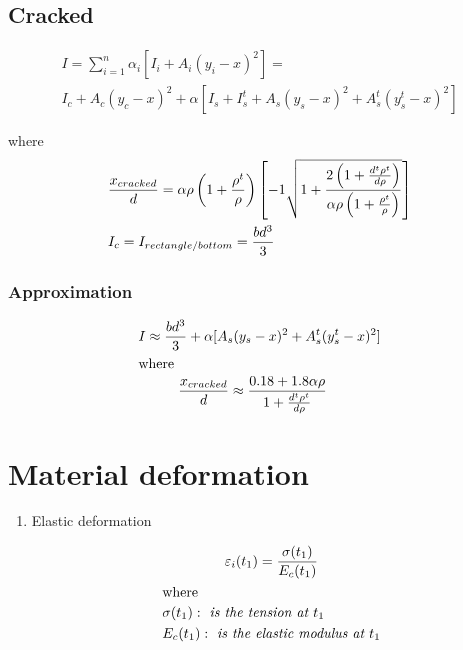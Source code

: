 \documentclass[landscape]{article}
\begin{document}
\begin{multicols*}{2}

    \subsection{Cracked} %
    \label{sub:cracked}

    \begin{multline}
      I = \sum_{i=1}^n \alpha_i[I_i + A_i (y_i-x)^2]=\\ I_c + A_c (y_c-x)^2 + \alpha[I_s + I_s^t + A_s (y_s-x)^2 + A_s^t (y_s^t-x)^2]  
    \end{multline}

  where
    $$
      \begin{aligned}
        &\frac{x_{cracked}}{d}= \alpha \rho \left(1 + \frac{\rho^t}{\rho} \right) \left[ - 1 \sqrt{1+ \frac{2\left(1 + \frac{d^t\rho^t}{d\rho}\right)}{\alpha \rho \left(1 + \frac{\rho^t}{\rho}\right) } }\right] \\
        & I_c= I_{rectangle/bottom} = \frac{bd^3}{3}
      \end{aligned}\notag
    $$

    \subsubsection{Approximation} %
    \label{ssub:approximation}

    \begin{gather}\label{eq:2.1}
      I \approx \frac{bd^3}{3}+ \alpha[ A_s (y_s-x)^2 + A_s^t (y_s^t-x)^2] \\
      \shortintertext{where}
      \begin{aligned}
        &\frac{x_{cracked}}{d} \approx \frac{0.18 + 1.8\alpha \rho }{1 + \frac{d^t \rho^t }{d \rho}}
      \end{aligned}\notag
    \end{gather}

\section{Material deformation} %
    \label{sec:material_properties}
    \begin{enumerate}
      \item Elastic deformation

      \begin{gather}\label{eq:2.1}
      \varepsilon_i(t_1) = \frac{\sigma(t_1) }{E_c (t_1)} \\
      \shortintertext{where}
      \begin{aligned}
        & \sigma(t_1): \emph{ is the tension at $t_1$} \\
        & E_c (t_1): \emph{ is the elastic modulus at $t_1$}
      \end{aligned}\notag
      \end{gather}


\end{enumerate}
\end{multicols*}
\end{document}
